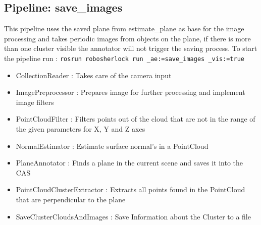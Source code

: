 \documentclass[main.tex]{subfiles}
\begin{document}
			\subsection{Pipeline: save\_images}
This pipeline uses the saved plane from estimate\_plane as base for the image processing and takes periodic images from objects on the plane, if there is more than one cluster visible the annotator will not trigger the saving process. To start the pipeline run : \texttt{rosrun robosherlock run \_ae:=save\_images \_vis:=true} 
\begin{itemize}
	\item CollectionReader : Takes care of the camera input
	\item ImagePreprocessor : Prepares image for further processing and implement image filters  
	\item PointCloudFilter : Filters points out of the cloud that are not in the range of the given parameters for X, Y and Z axes
	\item NormalEstimator : Estimate surface normal's in a PointCloud 
	\item PlaneAnnotator : Finds a plane in the current scene and saves it into the CAS
	\item PointCloudClusterExtractor : Extracts all points found in the PointCloud that are perpendicular to the plane 
	\item SaveClusterCloudsAndImages : Save Information about the Cluster to a file 
\end{itemize}
\end{document}
